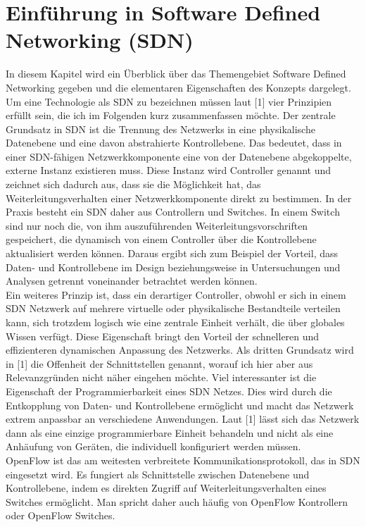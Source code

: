\documentclass[conference]{IEEEtran}
\begin{document}
\section{Einführung in Software Defined Networking (SDN)}

In diesem Kapitel wird ein Überblick über das Themengebiet Software Defined Networking gegeben und die elementaren Eigenschaften des Konzepts dargelegt. Um eine Technologie als SDN zu bezeichnen müssen laut [1] vier Prinzipien erfüllt sein, die ich im Folgenden kurz zusammenfassen möchte. Der zentrale Grundsatz in SDN ist die Trennung des Netzwerks in eine physikalische Datenebene und eine davon abstrahierte Kontrollebene. Das bedeutet, dass in einer SDN-fähigen Netzwerkkomponente eine von der Datenebene abgekoppelte, externe Instanz existieren muss. Diese Instanz wird Controller genannt und zeichnet sich dadurch aus, dass sie die Möglichkeit hat, das Weiterleitungsverhalten einer Netzwerkkomponente direkt zu bestimmen. In der Praxis besteht ein SDN daher aus Controllern und Switches. In einem Switch sind nur noch die, von ihm auszuführenden Weiterleitungsvorschriften gespeichert, die dynamisch von einem Controller über die Kontrollebene aktualisiert werden können.  Daraus ergibt sich zum Beispiel der Vorteil, dass Daten- und Kontrollebene im Design beziehungsweise in Untersuchungen und Analysen getrennt voneinander betrachtet werden können. \\
Ein weiteres Prinzip ist, dass ein derartiger Controller, obwohl er sich in einem SDN Netzwerk auf mehrere virtuelle oder physikalische Bestandteile verteilen kann, sich trotzdem logisch wie eine zentrale Einheit verhält, die über globales Wissen verfügt. Diese Eigenschaft bringt den Vorteil der schnelleren und effizienteren dynamischen Anpassung des Netzwerks.
Als dritten Grundsatz wird in [1] die Offenheit der Schnittstellen genannt, worauf ich hier aber aus Relevanzgründen nicht näher eingehen möchte. Viel interessanter ist die Eigenschaft der Programmierbarkeit eines SDN Netzes. Dies wird durch die Entkopplung von Daten- und Kontrollebene ermöglicht und macht das Netzwerk extrem anpassbar an verschiedene Anwendungen. Laut [1] lässt sich das Netzwerk dann als eine einzige programmierbare Einheit behandeln und nicht als eine Anhäufung von Geräten, die individuell konfiguriert werden müssen.\\
OpenFlow ist das am weitesten verbreitete Kommunikationsprotokoll, das in SDN eingesetzt wird. Es fungiert als Schnittstelle zwischen Datenebene und Kontrollebene, indem es direkten Zugriff auf Weiterleitungsverhalten eines Switches ermöglicht. Man spricht daher auch häufig von OpenFlow Kontrollern oder OpenFlow Switches. 
\end{document}

